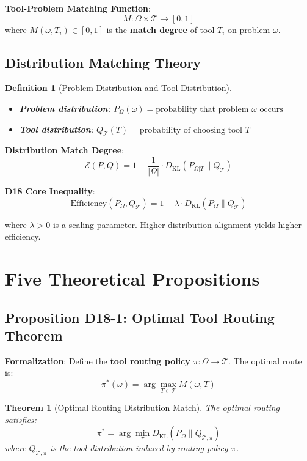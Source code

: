 \documentclass[12pt, a4paper]{article}
\newtheorem{definition}{Definition}[section]
\newtheorem{theorem}{Theorem}[section]
\newcommand{\KL}{D_{\mathrm{KL}}}
\newcommand{\argmax}{\arg\max}
\newcommand{\argmin}{\arg\min}
\begin{document}
\textbf{Tool-Problem Matching Function}:
$$M: \Omega \times \mathcal{T} \to [0, 1]$$
where $M(\omega, T_i) \in [0,1]$ is the \textbf{match degree} of tool $T_i$ on problem $\omega$.

\subsection{Distribution Matching Theory}

\begin{definition}[Problem Distribution and Tool Distribution]\label{def:d18-3}
\begin{itemize}
\item \textbf{Problem distribution}: $P_{\Omega}(\omega) = \text{probability that problem } \omega \text{ occurs}$
\item \textbf{Tool distribution}: $Q_{\mathcal{T}}(T) = \text{probability of choosing tool } T$
\end{itemize}
\end{definition}

\textbf{Distribution Match Degree}:
$$\mathcal{E}(P, Q) = 1 - \frac{1}{|\Omega|} \cdot \KL(P_{\Omega|T} \| Q_{\mathcal{T}})$$

\textbf{D18 Core Inequality}:
$$\text{Efficiency}(P_{\Omega}, Q_{\mathcal{T}}) = 1 - \lambda \cdot \KL(P_{\Omega} \| Q_{\mathcal{T}})$$

where $\lambda > 0$ is a scaling parameter. Higher distribution alignment yields higher efficiency.

\section{Five Theoretical Propositions}

\subsection{Proposition D18-1: Optimal Tool Routing Theorem}

\textbf{Formalization}: Define the \textbf{tool routing policy} $\pi: \Omega \to \mathcal{T}$. The optimal route is:
$$\pi^*(\omega) = \argmax_{T \in \mathcal{T}} M(\omega, T)$$

\begin{theorem}[Optimal Routing Distribution Match]\label{thm:d18-1}
The optimal routing satisfies:
$$\pi^* = \argmin_{\pi} \KL(P_{\Omega} \| Q_{\mathcal{T},\pi})$$
where $Q_{\mathcal{T},\pi}$ is the tool distribution induced by routing policy $\pi$.
\end{theorem}
\end{document}

